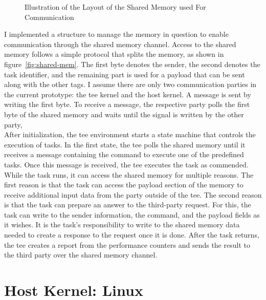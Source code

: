\begin{center}
    \begin{figure}
        \centering
        
        \caption{Illustration of the Layout of the Shared Memory used For Communication}
        \label{fig:state:technical:paging}
    \end{figure}
\end{center}

I implemented a structure to manage the memory in question to enable
communication through the shared memory channel. Access to the shared memory
follows a simple protocol that splits the memory, as shown in
figure~\ref{fig:shared-mem}. The first byte denotes the sender, the second
denotes the task identifier, and the remaining part is used for a payload that
can be sent along with the other tags. I assume there are only two communication
parties in the current prototype: the \gls{tee} kernel and the host kernel. A
message is sent by writing the first byte. To receive a message, the respective
party polls the first byte of the shared memory and waits until the signal is
written by the other party, \\

After initialization, the \gls{tee} environment starts a state machine that
controls the execution of tasks. In the first state, the \gls{tee} polls the
shared memory until it receives a message containing the command to execute one
of the predefined tasks. Once this message is received, the \gls{tee} executes
the task as commended. While the task runs, it can access the shared memory for
multiple reasons. The first reason is that the task can access the payload
section of the memory to receive additional input data from the party outside of
the \gls{tee}. The second reason is that the task can prepare an answer to the
third-party request. For this, the task can write to the sender information, the
command, and the payload fields as it wishes. It is the task's responsibility to
write to the shared memory data needed to create a response to the request once
it is done. After the task returns, the \gls{tee} creates a report from the
performance counters and sends the result to the third party over the shared
memory channel. \\

\section{Host Kernel: Linux}
\label{sec:implementation:hostKernel}

